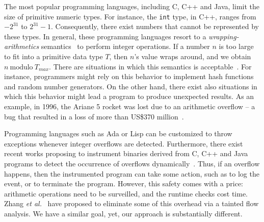 \documentclass{sigplanconf}[10pt]
\begin{document}
The most popular programming languages, including C, C++ and Java, limit the
size of primitive numeric types.
For instance, the \texttt{int} type, in C++, ranges from $-2^{31}$ to
$2^{31}-1$.
Consequently, there exist numbers that cannot be represented by these types.
In general, these programming languages resort to a {\em wrapping-arithmetics}
semantics~\cite{Warren02} to perform integer operations.
If a number $n$ is too large to fit into a primitive data type $T$, then $n$'s
value wraps around, and we obtain $n \ \mbox{modulo} \ T_{max}$.
There are situations in which this semantics is acceptable~\cite{Dietz12}.
For instance, programmers might rely on this behavior to implement hash
functions and random number generators.
On the other hand, there exist also situations in which this behavior might
lead a program to produce unexpected results.
As an example, in 1996, the Ariane 5 rocket was lost due to an arithmetic
overflow -- a bug that resulted in a loss of more than US\$370 million~\cite{Dowson97}.



Programming languages such as Ada or Lisp can be customized to throw exceptions
whenever integer overflows are detected.
Furthermore, there exist recent works proposing to instrument binaries
derived from C, C++ and Java programs to detect the occurrence of overflows
dynamically~\cite{Brumley07,Dietz12}.
Thus, if an overflow happens, then the instrumented program can take some
action, such as to log the event, or to terminate the program.
However, this safety comes with a price: arithmetic operations need to be
surveilled, and the runtime checks cost time.
Zhang {\em et al.}~\cite{Zhang10} have proposed to eliminate some of this
overhead via a tainted flow analysis.
We have a similar goal, yet, our approach is substantially different.
\end{document}
